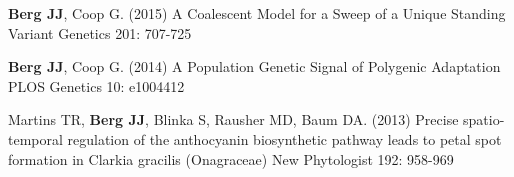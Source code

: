 \documentclass[letterpaper]{article}
\begin{document}
\begin{etaremune}
\item {\bf Berg JJ}, Coop G. (2015)  A Coalescent Model for a Sweep of a Unique Standing Variant Genetics 201: 707-725 
\item {\bf Berg JJ}, Coop G. (2014)  A Population Genetic Signal of Polygenic Adaptation PLOS Genetics 10: e1004412
\item Martins TR,  {\bf Berg JJ}, Blinka S, Rausher MD, Baum DA. (2013)  Precise spatio-temporal regulation of the anthocyanin biosynthetic pathway leads to petal spot formation in Clarkia gracilis (Onagraceae) New Phytologist 192: 958-969


\end{etaremune}
\end{document}
